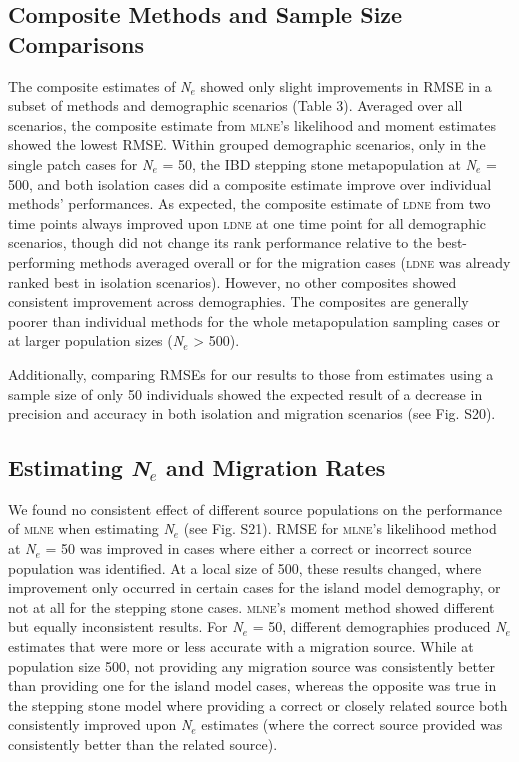 \subsection{Composite Methods and Sample Size Comparisons}
The composite estimates of \emph{N}$_e$ showed only slight improvements in RMSE in a subset of 
methods and demographic scenarios (Table 3). Averaged over all scenarios, the composite estimate from 
\textsc{mlne}'s likelihood and moment estimates showed the lowest RMSE. Within grouped demographic 
scenarios, only in the single patch cases for \emph{N}$_e$ = 50, the IBD stepping stone metapopulation 
at \emph{N}$_e$ = 500, and both isolation cases did a composite estimate improve over individual methods' 
performances. As expected, the composite estimate of \textsc{ldne} from two time points always improved upon 
\textsc{ldne} at one time point for all demographic scenarios, though did not change its rank performance 
relative to the best-performing methods averaged overall or for the migration cases (\textsc{ldne} was 
already ranked best in isolation scenarios). However, no other composites showed consistent improvement 
across demographies. The composites are generally poorer than individual methods for the whole 
metapopulation sampling cases or at larger population sizes (\emph{N}$_e$ > 500).

Additionally, comparing RMSEs for our results to those from estimates using a sample size of only 50 
individuals showed the expected result of a decrease in precision and accuracy in both isolation and 
migration scenarios (see Fig. S20).

\subsection{Estimating \emph{N}$_e$ and Migration Rates}
We found no consistent effect of different source populations on the performance of \textsc{mlne} when 
estimating \emph{N}$_e$ (see Fig. S21). RMSE for \textsc{mlne}'s likelihood method at \emph{N}$_e$ = 50 
was improved in cases where either a correct or incorrect source population was identified. At a local size of 
500, these results changed, where improvement only occurred in certain cases for the island model 
demography, or not at all for the stepping stone cases. \textsc{mlne}'s moment method showed different 
but equally inconsistent results. For \emph{N}$_e$ = 50, different demographies produced \emph{N}$_e$ 
estimates that were more or less accurate with a migration source. While at population size 500, not providing 
any migration source was consistently better than providing one for the island model cases, whereas the 
opposite was true in the stepping stone model where providing a correct or closely related source both 
consistently improved upon \emph{N}$_e$ estimates (where the correct source provided was consistently 
better than the related source).

